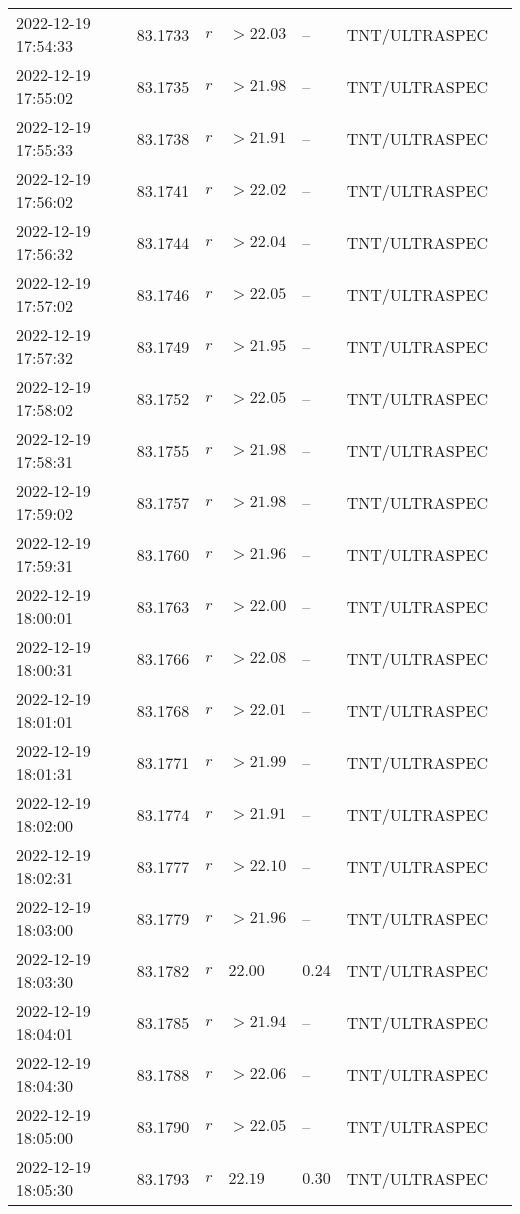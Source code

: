 \documentclass{nature_plusfigure}
\begin{document}
\begin{supplement}
\begin{center}
\begin{longtable}{lllllll}
2022-12-19 17:54:33 & 83.1733 & $r$ & $>22.03$ & -- & TNT/ULTRASPEC &  \\ 
2022-12-19 17:55:02 & 83.1735 & $r$ & $>21.98$ & -- & TNT/ULTRASPEC &  \\ 
2022-12-19 17:55:33 & 83.1738 & $r$ & $>21.91$ & -- & TNT/ULTRASPEC &  \\ 
2022-12-19 17:56:02 & 83.1741 & $r$ & $>22.02$ & -- & TNT/ULTRASPEC &  \\ 
2022-12-19 17:56:32 & 83.1744 & $r$ & $>22.04$ & -- & TNT/ULTRASPEC &  \\ 
2022-12-19 17:57:02 & 83.1746 & $r$ & $>22.05$ & -- & TNT/ULTRASPEC &  \\ 
2022-12-19 17:57:32 & 83.1749 & $r$ & $>21.95$ & -- & TNT/ULTRASPEC &  \\ 
2022-12-19 17:58:02 & 83.1752 & $r$ & $>22.05$ & -- & TNT/ULTRASPEC &  \\ 
2022-12-19 17:58:31 & 83.1755 & $r$ & $>21.98$ & -- & TNT/ULTRASPEC &  \\ 
2022-12-19 17:59:02 & 83.1757 & $r$ & $>21.98$ & -- & TNT/ULTRASPEC &  \\ 
2022-12-19 17:59:31 & 83.1760 & $r$ & $>21.96$ & -- & TNT/ULTRASPEC &  \\ 
2022-12-19 18:00:01 & 83.1763 & $r$ & $>22.00$ & -- & TNT/ULTRASPEC &  \\ 
2022-12-19 18:00:31 & 83.1766 & $r$ & $>22.08$ & -- & TNT/ULTRASPEC &  \\ 
2022-12-19 18:01:01 & 83.1768 & $r$ & $>22.01$ & -- & TNT/ULTRASPEC &  \\ 
2022-12-19 18:01:31 & 83.1771 & $r$ & $>21.99$ & -- & TNT/ULTRASPEC &  \\ 
2022-12-19 18:02:00 & 83.1774 & $r$ & $>21.91$ & -- & TNT/ULTRASPEC &  \\ 
2022-12-19 18:02:31 & 83.1777 & $r$ & $>22.10$ & -- & TNT/ULTRASPEC &  \\ 
2022-12-19 18:03:00 & 83.1779 & $r$ & $>21.96$ & -- & TNT/ULTRASPEC &  \\ 
2022-12-19 18:03:30 & 83.1782 & $r$ & $22.00$ & $0.24$ & TNT/ULTRASPEC &  \\ 
2022-12-19 18:04:01 & 83.1785 & $r$ & $>21.94$ & -- & TNT/ULTRASPEC &  \\ 
2022-12-19 18:04:30 & 83.1788 & $r$ & $>22.06$ & -- & TNT/ULTRASPEC &  \\ 
2022-12-19 18:05:00 & 83.1790 & $r$ & $>22.05$ & -- & TNT/ULTRASPEC &  \\ 
2022-12-19 18:05:30 & 83.1793 & $r$ & $22.19$ & $0.30$ & TNT/ULTRASPEC &  \\ 

\end{longtable}
\end{center}
\end{supplement}
\end{document}

